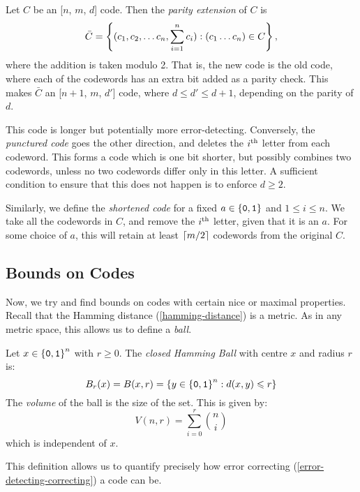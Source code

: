 \documentclass{article}
\begin{document}
\begin{definition}
    Let $C$ be an [$n$, $m$, $d$] code.
    Then the \textit{parity extension} of $C$ is
    \[
	\bar C =
	\left\lbrace (c_1, c_2, \dots c_n, \sum_{i=1}^n c_i) : (c_1 \dots c_n) \in C \right\rbrace,
	\]
	where the addition is taken modulo 2.
	That is, the new code is the old code,
	where each of the codewords has an extra bit added as a parity check.
	This makes $\bar C$ an [$n+1$, $m$, $d'$] code,
	where $d \leq d' \leq d+1$, depending on the parity of $d$.
	
	This code is longer but potentially more error-detecting.
	Conversely, the \textit{punctured code}
	goes the other direction, and deletes the $i^{\text{th}}$ letter from each codeword.
	This forms a code which is one bit shorter,
	but possibly combines two codewords,
	unless no two codewords differ only in this letter.
	A sufficient condition to ensure that this does not happen
	is to enforce $d \geq 2$.
	
	Similarly, we define the \textit{shortened code}
	for a fixed $a \in \left\lbrace \texttt{0}, \texttt{1} \right\rbrace$ and $1 \leq i \leq n$.
	We take all the codewords in $C$, and remove the $i^{\text{th}}$ letter,
	given that it is an $a$. For some choice of $a$,
	this will retain at least $\left\lceil m/2\right\rceil$ codewords from the original $C$.
\end{definition}


\subsection{Bounds on Codes}

Now, we try and find bounds on codes with certain nice or maximal properties.
Recall that the Hamming distance (\ref{hamming-distance}) is a metric.
As in any metric space, this allows us to define a \textit{ball}.

\begin{definition}
    Let $x \in \left\lbrace \texttt{0}, \texttt{1} \right\rbrace^n$ with $r \geq 0$.
    The \textit{closed Hamming Ball} with centre $x$ and radius $r$ is:
    \[
	B_r(x) = B(x, r) =
	\left\lbrace y \in \left\lbrace \texttt{0}, \texttt{1} \right\rbrace^n : d(x, y) \leqslant r \right\rbrace
	\]
	The \textit{volume} of the ball is the size of the set.
	This is given by:
	\[
	V(n, r) = \sum_{i=0}^r \binom n i
	\]
	which is independent of $x$.
\end{definition}

This definition allows us to quantify precisely how error correcting
(\ref{error-detecting-correcting})
a code can be.
\end{document}
